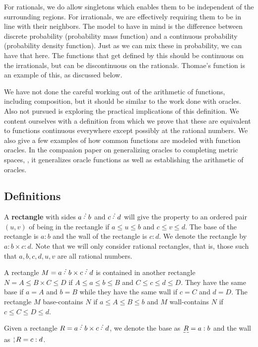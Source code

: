 \documentclass[12pt]{article}
\theoremstyle{remark}
\begin{document}
For rationals, we do allow singletons which enables them to be independent of the surrounding regions. For irrationals, we are effectively requiring them to be in line with their neighbors. The model to have in mind is the difference between discrete probability (probability mass function) and a continuous probability (probability density function). Just as we can mix these in probability, we can have that here. The functions that get defined by this should be continuous on the irrationals, but can be discontinuous on the rationals. Thomae's function is an example of this, as discussed below. 

We have not done the careful working out of the arithmetic of functions, including composition, but it should be similar to the work done with oracles. Also not pursued is exploring the practical implications of this definition. We content ourselves with a definition from which we prove that these are equivalent to functions continuous everywhere except possibly at the rational numbers. We also give a few examples of how common functions are modeled with function oracles. In the companion paper on generalizing oracles to completing metric spaces, \cite{taylor23metric}, it generalizes oracle functions as well as establishing the arithmetic of oracles. 

\subsection{Definitions}

A \textbf{rectangle} with sides $a \lte b$ and $c \lte d$ will give the property to an ordered pair $(u, v)$ of being in the rectangle if $a \leq u \leq b$ and $c \leq v \leq d$. The base of the rectangle is $a:b$ and the wall of the rectangle is $c:d$. We denote the rectangle by $a:b \times c:d$. Note that we will only consider rational rectangles, that is, those such that $a, b, c, d, u, v$ are all rational numbers. 

A rectangle $M = a \lte b \times c \lte d$ is contained in another rectangle $N = A \leq B \times C \leq D$ if $A \leq a \leq b \leq B$ and $C \leq c \leq d \leq D$. They have the same base if $a=A$ and $b=B$ while they have the same wall if $c=C$ and $d=D$. The rectangle $M$ base-contains $N$ if $a \leq A \leq B \leq b$ and $M$ wall-contains $N$ if $c \leq C \leq D \leq d$.

Given a rectangle $R = a \lte b \times c \lte d$, we denote the base as $\base{R} = a:b$ and the wall as $\wall{R} = c:d$. 
\end{document}
